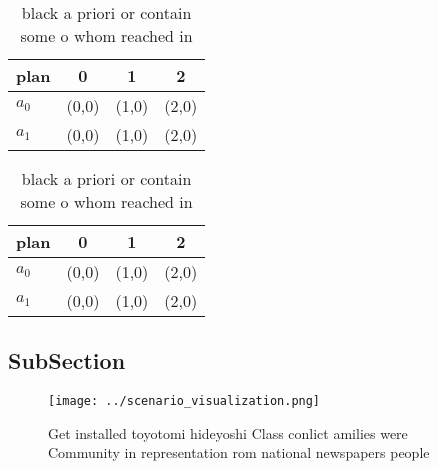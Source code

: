 \documentclass[a4paper]{article}
\begin{document}
\begin{table}
\begin{adjustbox}{width=0.6\columnwidth}
\begin{tabular}{|l|l|l|l|}
\hline
\textbf{plan} & \multicolumn{1}{c|}{\textbf{0}} & \multicolumn{1}{c|}{\textbf{1}} & \multicolumn{1}{c|}{\textbf{2}} \\ \hline
\textbf{$a_0$}  & (0,0) & (1,0) & (2,0) \\ \hline
\textbf{$a_1$}  & (0,0) & (1,0) & (2,0) \\ \hline
\end{tabular}
\end{adjustbox}
\caption{ black a priori or contain some o whom reached in
}
\end{table}

\begin{table}
\begin{adjustbox}{width=0.6\columnwidth}
\begin{tabular}{|l|l|l|l|}
\hline
\textbf{plan} & \multicolumn{1}{c|}{\textbf{0}} & \multicolumn{1}{c|}{\textbf{1}} & \multicolumn{1}{c|}{\textbf{2}} \\ \hline
\textbf{$a_0$}  & (0,0) & (1,0) & (2,0) \\ \hline
\textbf{$a_1$}  & (0,0) & (1,0) & (2,0) \\ \hline
\end{tabular}
\end{adjustbox}
\caption{ black a priori or contain some o whom reached in
}
\end{table}

\subsection{SubSection}

\begin{figure}
\centering
\texttt{[image: ../scenario\_visualization.png]}
\caption{Get installed toyotomi hideyoshi Class conlict amilies were Community in representation rom national newspapers people 
}
\end{figure}
 
\end{document}
